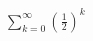 \documentclass[border=6pt]{standalone}
\begin{document}
$
\displaystyle\sum_{k=0}^\infty \left(\frac{1}{2}\right)^k
$
\end{document}

